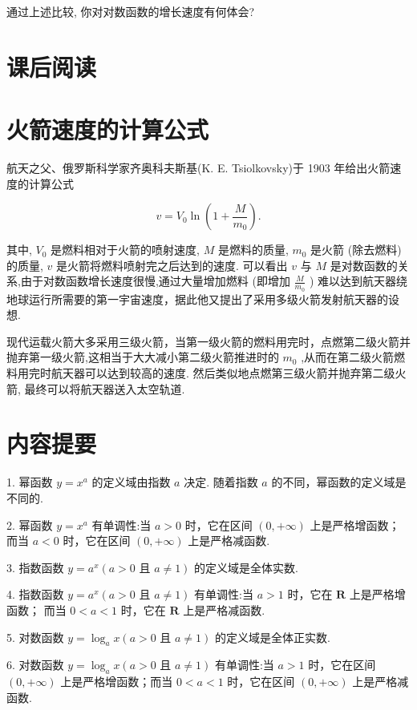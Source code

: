 \documentclass[10pt]{article}
\begin{document}
通过上述比较, 你对对数函数的增长速度有何体会?



\section*{课后阅读}

\section*{火箭速度的计算公式}

航天之父、俄罗斯科学家齐奥科夫斯基(K. E. Tsiolkovsky)于 1903 年给出火箭速度的计算公式

\[
v = {V}_{0}\ln \left( {1 + \frac{M}{{m}_{0}}}\right) .
\]

其中, \({V}_{0}\) 是燃料相对于火箭的喷射速度, \(M\) 是燃料的质量, \({m}_{0}\) 是火箭 (除去燃料) 的质量, \(v\) 是火箭将燃料喷射完之后达到的速度. 可以看出 \(v\) 与 \(M\) 是对数函数的关系,由于对数函数增长速度很慢,通过大量增加燃料 (即增加 \(\frac{M}{{m}_{0}}\) ) 难以达到航天器绕地球运行所需要的第一宇宙速度，据此他又提出了采用多级火箭发射航天器的设想.

现代运载火箭大多采用三级火箭，当第一级火箭的燃料用完时，点燃第二级火箭并抛弃第一级火箭,这相当于大大减小第二级火箭推进时的 \({m}_{0}\) ,从而在第二级火箭燃料用完时航天器可以达到较高的速度. 然后类似地点燃第三级火箭并抛弃第二级火箭, 最终可以将航天器送入太空轨道.

\section*{内容提要}

1. 幂函数 \(y = {x}^{a}\) 的定义域由指数 \(a\) 决定. 随着指数 \(a\) 的不同，幂函数的定义域是不同的.

2. 幂函数 \(y = {x}^{a}\) 有单调性:当 \(a > 0\) 时，它在区间 \(\left( {0, + \infty }\right)\) 上是严格增函数；而当 \(a < 0\) 时，它在区间 \(\left( {0, + \infty }\right)\) 上是严格减函数.

3. 指数函数 \(y = {a}^{x}\left( {a > 0\text{ 且 }a \neq  1}\right)\) 的定义域是全体实数.

4. 指数函数 \(y = {a}^{x}\left( {a > 0\text{ 且 }a \neq  1}\right)\) 有单调性:当 \(a > 1\) 时，它在 \(\mathbf{R}\) 上是严格增函数； 而当 \(0 < a < 1\) 时，它在 \(\mathbf{R}\) 上是严格减函数.

5. 对数函数 \(y = {\log }_{a}x\left( {a > 0\text{ 且 }a \neq  1}\right)\) 的定义域是全体正实数.

6. 对数函数 \(y = {\log }_{a}x\left( {a > 0\text{ 且 }a \neq  1}\right)\) 有单调性:当 \(a > 1\) 时，它在区间 \(\left( {0, + \infty }\right)\) 上是严格增函数；而当 \(0 < a < 1\) 时，它在区间 \(\left( {0, + \infty }\right)\) 上是严格减函数.
\end{document}
